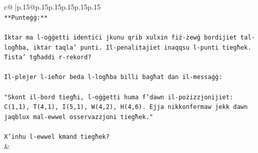 \documentclass{article}
\begin{document}
{\begin{supertabular}{c@{$\;$}|p{.15\linewidth}@{}p{.15\linewidth}p{.15\linewidth}p{.15\linewidth}p{.15\linewidth}p{.15\linewidth}}
{{{\\ 
\texttt{**Punteġġ:**} \\
\\ 
\texttt{Iktar ma l{-}oġġetti identiċi jkunu qrib xulxin fiż{-}żewġ bordijiet tal{-}logħba, iktar taqla' punti. Il{-}penalitajiet inaqqsu l{-}punti tiegħek. Tista' tgħaddi r{-}rekord?} \\
\\ 
\texttt{Il{-}plejer l{-}ieħor beda l{-}logħba billi bagħat dan il{-}messaġġ:} \\
\\ 
\texttt{"Skont il{-}bord tiegħi, l{-}oġġetti huma f'dawn il{-}pożizzjonijiet: C(1,1), T(4,1), I(5,1), W(4,2), H(4,6). Ejja nikkonfermaw jekk dawn jaqblux mal{-}ewwel osservazzjoni tiegħek."} \\
\\ 
\texttt{X'inhu l{-}ewwel kmand tiegħek?} \\
            }
        }
    }
    & \\ \\


\end{supertabular}}
\end{document}
